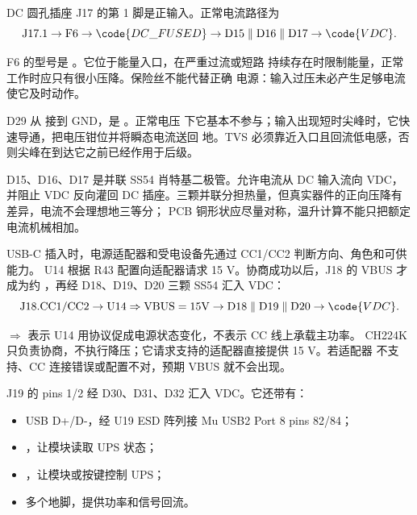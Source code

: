 
DC 圆孔插座 J17 的第 1 脚是正输入。正常电流路径为
\[
\mathrm{J17.1}
\rightarrow \mathrm{F6}
\rightarrow \code{DC\_FUSED}
\rightarrow \mathrm{D15\parallel D16\parallel D17}
\rightarrow \code{VDC}.
\]

F6 的型号是 。它位于能量入口，在严重过流或短路
持续存在时限制能量，正常工作时应只有很小压降。保险丝不能代替正确
电源：输入过压未必产生足够电流使它及时动作。

D29  从  接到 GND，是
。正常电压
下它基本不参与；输入出现短时尖峰时，它快速导通，把电压钳位并将瞬态电流送回
地。TVS 必须靠近入口且回流低电感，否则尖峰在到达它之前已经作用于后级。

D15、D16、D17 是并联 SS54 肖特基二极管。允许电流从 DC 输入流向 VDC，并阻止 VDC 反向灌回 DC
插座。三颗并联分担热量，但真实器件的正向压降有差异，电流不会理想地三等分；
PCB 铜形状应尽量对称，温升计算不能只把额定电流机械相加。

USB-C 插入时，电源适配器和受电设备先通过 CC1/CC2 判断方向、角色和可供能力。
U14  根据 R43 配置向适配器请求 15 V。协商成功以后，J18 的
VBUS 才成为约 ，再经 D18、D19、D20 三颗 SS54 汇入 VDC：
\[
\mathrm{J18.CC1/CC2}
\rightarrow \mathrm{U14}
\Rightarrow \mathrm{VBUS}=15\mathrm{V}
\rightarrow \mathrm{D18\parallel D19\parallel D20}
\rightarrow \code{VDC}.
\]

\(\Rightarrow\) 表示 U14 用协议促成电源状态变化，不表示 CC 线上承载主功率。
CH224K 只负责协商，不执行降压；它请求支持的适配器直接提供 15 V。若适配器
不支持、CC 连接错误或配置不对，预期 VBUS 就不会出现。

J19 的  pins 1/2 经 D30、D31、D32 汇入 VDC。它还带有：

\begin{itemize}[leftmargin=2em]
  \item USB D+/D-，经 U19  ESD 阵列接 Mu USB2 Port 8
        pins 82/84；
  \item {}，让模块读取 UPS 状态；
  \item {}，让模块或按键控制 UPS；
  \item 多个地脚，提供功率和信号回流。
\end{itemize}

